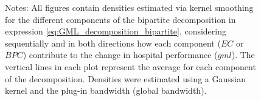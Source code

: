 \documentclass[11pt,a4paper,oneside]{article}
\begin{document}
\begin{figure}[htbp]
\vspace{.3cm}


\parbox[t]{155mm}{\footnotesize Notes: All figures contain densities estimated via kernel smoothing for the different components of the bipartite decomposition in expression \eqref{eq:GML_decomposition_bipartite}, considering sequentially and in both directions how each component ($EC$ or $BPC$) contribute to the change in hospital performance ($gml$). The vertical lines in each plot represent the average for each component of the decomposition. Densities were estimated using a Gaussian kernel and the \cite{sheatherjones} plug-in bandwidth (global bandwidth).}

\end{figure}



\pagebreak
\clearpage














\end{document}
